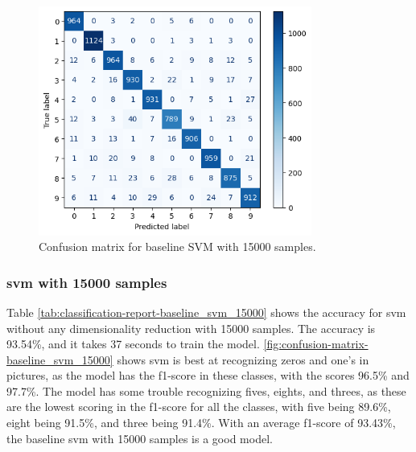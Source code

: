 
\begin{figure}[htb!]
    \centering
    \includegraphics[width=0.8\textwidth]{figures/1-experiment/confusion_matrix_baseline_svm_15000.png}
    \caption{Confusion matrix for baseline SVM with 15000 samples.}
    \label{fig:confusion-matrix-baseline_svm_15000}
\end{figure}
\subsubsection{\gls{svm} with 15000 samples}\label{subsubsec:experiment-1-results-svm-15000}
Table \ref{tab:classification-report-baseline_svm_15000} shows the accuracy for \gls{svm} without any dimensionality reduction with 15000 samples. The accuracy is 93.54\%, and it takes 37 seconds to train the model. \autoref{fig:confusion-matrix-baseline_svm_15000} shows \gls{svm} is best at recognizing zeros and one's in pictures, as the model has the f1-score in these classes, with the scores 96.5\% and 97.7\%. The model has some trouble recognizing fives, eights, and threes, as these are the lowest scoring in the f1-score for all the classes, with five being 89.6\%, eight being 91.5\%, and three being 91.4\%. With an average f1-score of 93.43\%, the baseline \gls{svm} with 15000 samples is a good model.

